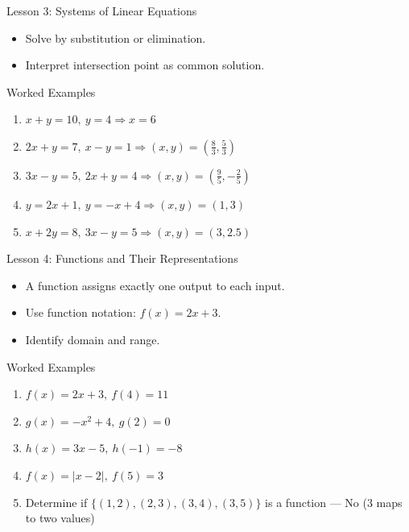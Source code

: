 \documentclass{beamer}
\begin{document}
\begin{frame}{Lesson 3: Systems of Linear Equations}
\begin{itemize}
  \item Solve by substitution or elimination.
  \item Interpret intersection point as common solution.
\end{itemize}
\end{frame}

\begin{frame}{Worked Examples}
\begin{enumerate}
  \item \( x + y = 10, \ y = 4 \Rightarrow x = 6 \)
  \item \( 2x + y = 7, \ x - y = 1 \Rightarrow (x, y) = (\tfrac{8}{3}, \tfrac{5}{3}) \)
  \item \( 3x - y = 5, \ 2x + y = 4 \Rightarrow (x, y) = (\tfrac{9}{5}, -\tfrac{2}{5}) \)
  \item \( y = 2x + 1, \ y = -x + 4 \Rightarrow (x, y) = (1, 3) \)
  \item \( x + 2y = 8, \ 3x - y = 5 \Rightarrow (x, y) = (3, 2.5) \)
\end{enumerate}
\end{frame}

\begin{frame}{Lesson 4: Functions and Their Representations}
\begin{itemize}
  \item A function assigns exactly one output to each input.
  \item Use function notation: $f(x) = 2x + 3$.
  \item Identify domain and range.
\end{itemize}
\end{frame}

\begin{frame}{Worked Examples}
\begin{enumerate}
  \item $f(x) = 2x + 3, \ f(4) = 11$
  \item $g(x) = -x^2 + 4, \ g(2) = 0$
  \item $h(x) = 3x - 5, \ h(-1) = -8$
  \item $f(x) = |x - 2|, \ f(5) = 3$
  \item Determine if $\{(1,2), (2,3), (3,4), (3,5)\}$ is a function — No (3 maps to two values)
\end{enumerate}
\end{frame}
\end{document}
